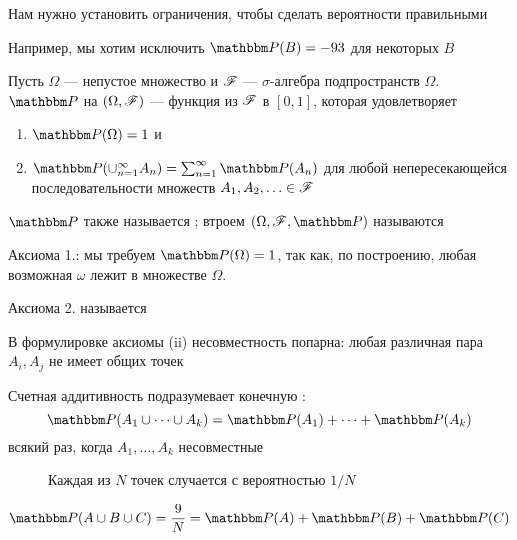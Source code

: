 \begin{frame}

    \vspace{2em}
    Нам нужно установить ограничения, чтобы сделать вероятности правильными
    
    Например, мы хотим исключить $\PP(B) = -93$ для некоторых $B$
    
    \vspace{1em}
    Пусть $\Omega$ --- непустое множество и $\mathscr F$ --- $\sigma$-алгебра 
    подпространств $\Omega$.  $\PP$ на $(\Omega, \mathscr F)$
    --- функция из $\mathscr F$ в $[0,1]$, которая удовлетворяет
    \begin{enumerate}
        \label{enum:prob}
      \item $\PP(\Omega) = 1$ и
      \item $\PP(\cup_{n=1}^{\infty} A_n) = \sum_{n=1}^{\infty} \PP(A_n)$ для любой 
      непересекающейся последовательности множеств $A_1, A_2, \ldots \in \mathscr F$
    \end{enumerate}
     
     $\PP$ также называется ; 
     втроем $(\Omega, \fF, \PP)$ называются 
    
\end{frame}

\begin{frame}
    
    \vspace{2em}
    Аксиома 1.: мы требуем $\PP(\Omega) = 1$,
    так как, по построению, любая возможная $\omega$ лежит в множестве $\Omega$.

    Аксиома 2. называется 
    
    В формулировке аксиомы (ii) несовместность попарна: любая различная пара 
     $A_i, A_j$ не имеет общих точек
    
    Счетная аддитивность подразумевает конечную :
    \begin{equation}
        \label{eq:add}
        \PP(A_1 \cup \cdots \cup A_k)
        = \PP (A_1) + \cdots + \PP (A_k)
    \end{equation}
    всякий раз, когда $A_1, \ldots, A_k$ несовместные
    
\end{frame}

\begin{frame}
    
    \vspace{2em}
    \begin{figure}
       \begin{center}
        \scalebox{.23}{}
        \caption{\label{f:additivity} Каждая из $N$ точек случается с вероятностью $1/N$}
       \end{center}
    \end{figure}
    \begin{equation*}
    \PP(A \cup B \cup C) = \frac{9}{N}  
    = \PP(A) + \PP(B) + \PP(C)
    \end{equation*}

\end{frame}

